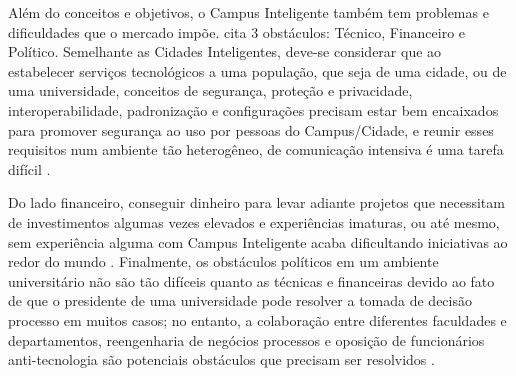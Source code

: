 Além do conceitos e objetivos, o Campus Inteligente também tem problemas e dificuldades que o mercado impõe. \cite{alghamdi} cita 3 obstáculos: Técnico, Financeiro e Político. Semelhante as Cidades Inteligentes, deve-se considerar que ao estabelecer serviços tecnológicos a uma população, que seja de uma cidade, ou de uma universidade, conceitos de segurança, proteção e privacidade, interoperabilidade, padronização e configurações precisam estar bem encaixados para promover segurança ao uso por pessoas do Campus/Cidade, e reunir esses requisitos num ambiente tão heterogêneo, de comunicação intensiva é uma tarefa difícil \cite{alghamdi}. 

Do lado financeiro, conseguir dinheiro para levar adiante projetos que necessitam de investimentos algumas vezes elevados e experiências imaturas, ou até mesmo, sem experiência alguma com Campus Inteligente acaba dificultando iniciativas ao redor do mundo . Finalmente, os obstáculos políticos em um ambiente universitário
não são tão difíceis quanto as técnicas e financeiras devido ao
fato de que o presidente de uma universidade pode resolver a tomada de decisão processo em muitos casos; no entanto, a colaboração entre
diferentes faculdades e departamentos, reengenharia de negócios
processos e oposição de funcionários anti-tecnologia são potenciais
obstáculos que precisam ser resolvidos \cite{alghamdi}.

